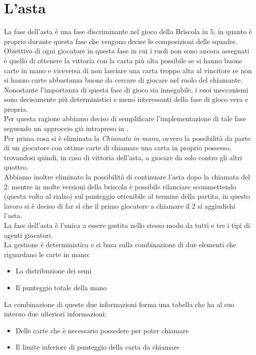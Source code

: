 \section{L'asta}

La fase dell'asta è una fase discriminante nel gioco della Briscola in 5, in quanto è proprio durante questa fase che vengono decise le composizioni delle squadre.\\
Obiettivo di ogni giocatore in questa fase in cui i ruoli non sono ancora assegnati è quello di ottenere la vittoria con la carta più alta possibile se si hanno buone carte in mano e viceversa di non lasciare una carta troppo alta al vincitore se non si hanno carte abbastanza buone da cercare di giocare nel ruolo del chiamante.\\
Nonostante l'importanza di questa fase di gioco sia innegabile, i suoi meccanismi sono decisamente più deterministici e meno interessanti della fase di gioco vera e propria.\\
Per questa ragione abbiamo deciso di semplificare l'implementazione di tale fase seguendo un approccio già intrapreso in \cite{villa}.\\
Per prima cosa si è eliminata la \emph{Chiamata in mano}, ovvero la possibilità da parte di un giocatore con ottime carte di chiamare una carta in proprio possesso, trovandosi quindi, in caso di vittoria dell'asta, a giocare da solo contro gli altri quattro.\\
Abbiamo inoltre eliminato la possibilità di continuare l'asta dopo la chiamata del 2: mentre in molte versioni della briscola è possibile rilanciare scommettendo (questa volta al rialzo) sul punteggio ottenibile al termine della partita, in questo lavoro si è deciso di far sì che il primo giocatore a chiamare il 2 si aggiudichi l'asta.\\
La fase dell'asta è l'unica a essere gestita nello stesso modo da tutti e tre i tipi di agenti giocatori.\\
La gestione è deterministica e si basa sulla combinazione di due elementi che riguardano le carte in mano:
\begin{itemize}
   \item La distribuzione dei semi
   \item Il punteggio totale della mano
\end{itemize}
La combinazione di queste due informazioni forma una tabella che ha al suo interno due ulteriori informazioni:
\begin{itemize}
   \item Delle carte che è necessario possedere per poter chiamare
   \item Il limite inferiore di punteggio della carta da chiamare 
\end{itemize}


